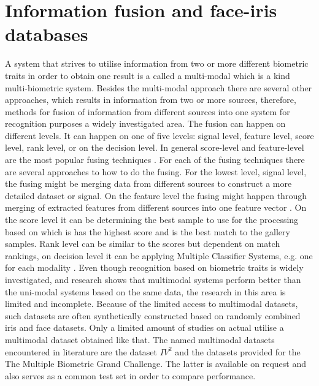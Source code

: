 

\section{Information fusion and face-iris databases}

A system that strives to utilise information from two or more different biometric traits in order to obtain one result is a called a multi-modal which is a kind multi-biometric system. Besides the multi-modal approach there are several other approaches, which results in information from two or more sources, therefore, methods for fusion of information from different sources into one system for recognition purposes a widely investigated area.  The fusion can happen on different levels. It can happen on one of five levels: signal level, feature level, score level, rank level, or on the decision level. In general score-level and feature-level are the most popular fusing techniques \citep{Bowyer2016b}. For each of the fusing techniques there are several approaches to how to do the fusing. For the lowest level, signal level, the fusing might be merging data from different sources to construct a more detailed dataset or signal. On the feature level the fusing might happen through merging of extracted features from different sources into one feature vector \citep{Ross2003}. On the score level it can be determining the best sample to use for the processing based on which is has the highest score and is the best match to the gallery samples. Rank level can be similar to the scores but dependent on match rankings, on decision level it can be applying Multiple Classifier Systems, e.g. one for each modality \citep{Fierrez2018b}.
Even though recognition based on biometric traits is widely investigated, and research shows that multimodal systems perform better than the uni-modal systems based on the same data, the research in this area is limited and incomplete. Because of the limited access to multimodal datasets, such datasets are often synthetically constructed based on randomly combined iris and face datasets. Only a limited amount of studies on actual utilise a multimodal dataset obtained like that. The named multimodal datasets encountered in literature are the dataset $IV^2$ and the datasets provided for the The Multiple Biometric Grand Challenge\citep{Bowyer2016b,Petrovska-Delacretaz2008a}. The latter is available on request and also serves as a common test set in order to compare performance.  